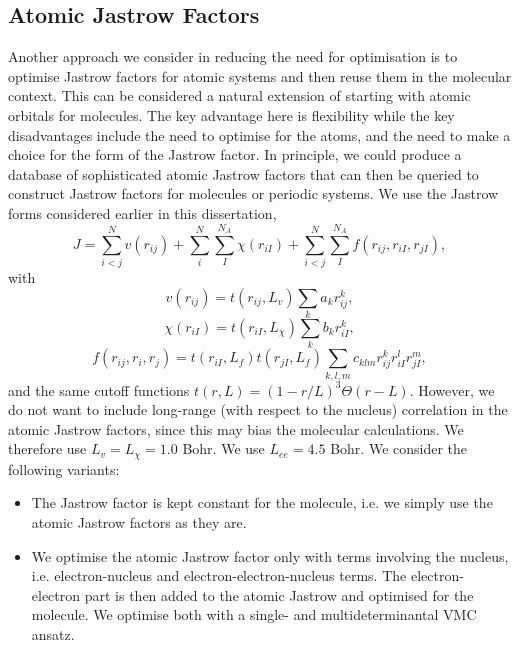 \subsection{Atomic Jastrow Factors}

Another approach we consider in reducing the need for optimisation is to optimise Jastrow factors for atomic systems and then reuse them in the molecular context. This can be considered a natural extension of starting with atomic orbitals for molecules. The key advantage here is flexibility while the key disadvantages include the need to optimise for the atoms, and the need to make a choice for the form of the Jastrow factor. In principle, we could produce a database of sophisticated atomic Jastrow factors that can then be queried to construct Jastrow factors for molecules or periodic systems. We use the Jastrow forms considered earlier in this dissertation, \begin{equation}
    \label{eq:jastrow-3}
    J = \sum_{i<j}^Nv(r_{ij}) + \sum_i^N\sum_I^{N_A}\chi(r_{iI}) + \sum_{i<j}^N\sum_I^{N_A}f(r_{ij}, r_{iI}, r_{jI}),
\end{equation}
with
\begin{equation}
    \label{eq:dtn-jastrow-ee-3}
    v(r_{ij})    = t(r_{ij},L_v)
                    \sum_{k} a_k r_{ij}^k ,
\end{equation}
\begin{equation}
    \label{eq:dtn-jastrow-en-3}
    \chi(r_{iI}) = t(r_{iI},L_\chi)
    \sum_{k} b_k r_{iI}^k ,
\end{equation}
\begin{equation}
    \label{eq:dtn-jastrow-een-3}
    f(r_{ij}, r_{i}, r_{j}) = t(r_{iI},L_f) t(r_{jI},L_f)
    \sum_{k,l,m} c_{klm}
    r_{ij}^k r_{iI}^l r_{jI}^m ,
\end{equation}
and the same cutoff functions $t(r,L) = (1-r/L)^3
\Theta(r-L)$. However, we do not want to include long-range (with respect to the nucleus) correlation in the atomic Jastrow factors, since this may bias the molecular calculations. We therefore use $L_v=L_\chi=1.0$ Bohr. We use $L_{ee}=4.5$ Bohr. We consider the following variants:
\begin{itemize}
    \item The Jastrow factor is kept constant for the molecule, i.e. we simply use the atomic Jastrow factors as they are.
    \item We optimise the atomic Jastrow factor only with terms involving the nucleus, i.e. electron-nucleus and electron-electron-nucleus terms. The electron-electron part is then added to the atomic Jastrow and optimised for the molecule. We optimise both with a single- and multideterminantal VMC ansatz.
\end{itemize}

